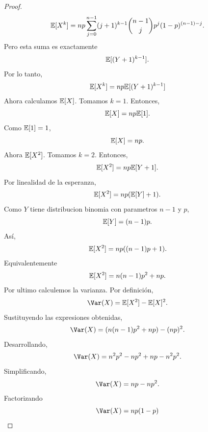 \documentclass[12pt,a4paper]{article}
\begin{document}
\begin{proof}
\begin{equation*}
            \mathbb{E}[X^{k}]=np\sum_{j=0}^{n-1}(j+1)^{k-1}\binom{n-1}{j}p^{j}(1-p)^{(n-1)-j}.
        \end{equation*}
        Pero esta suma es exactamente
        \begin{equation*}
            \mathbb{E}[(Y+1)^{k-1}].
        \end{equation*}
        Por lo tanto,
        \begin{equation*}
            \mathbb{E}[X^{k}]=np\mathbb{E}[(Y+1)^{k-1}]
        \end{equation*}
        Ahora calculamos $\mathbb{E}[X]$. Tomamos $k=1$. Entonces,
        \begin{equation*}
            \mathbb{E}[X]=np\mathbb{E}[1].
        \end{equation*}
        Como $\mathbb{E}[1]=1$,
        \begin{equation*}
            \mathbb{E}[X]=np.
        \end{equation*}
        Ahora $\mathbb{E}[X^{2}]$. Tomamos $k=2$. Entonces,
        \begin{equation*}
            \mathbb{E}[X^{2}]=np\mathbb{E}[Y+1].
        \end{equation*}
        Por linealidad de la esperanza,
        \begin{equation*}
            \mathbb{E}[X^{2}]=np(\mathbb{E}[Y]+1).
        \end{equation*}
        Como $Y$ tiene distribucion binomia con parametros $n-1$ y $p$,
        \begin{equation*}
            \mathbb{E}[Y]=(n-1)p.
        \end{equation*}
        Así,
        \begin{equation*}
            \mathbb{E}[X^{2}]=np((n-1)p+1).
        \end{equation*}
        Equivalentemente
        \begin{equation*}
            \mathbb{E}[X^{2}]=n(n-1)p^{2}+np.
        \end{equation*}
        Por ultimo calculemos la varianza. Por definición,
        \begin{equation*}
            \Var(X)=\E[X^{2}]-\E[X]^{2}.
        \end{equation*}
        Sustituyendo las expresiones obtenidas,
        \begin{equation*}
            \Var(X)=(n(n-1)p^{2}+np)-(np)^{2}.
        \end{equation*}
        Desarrollando,
        \begin{equation*}
            \Var(X)=n^{2}p^{2}-np^{2}+np-n^{2}p^{2}.
        \end{equation*}
        Simplificando,
        \begin{equation*}
            \Var(X)=np-np^{2}.
        \end{equation*}
        Factorizando
        \begin{equation*}
            \Var(X)=np(1-p)
        \end{equation*}
    \end{proof}
\end{document}
